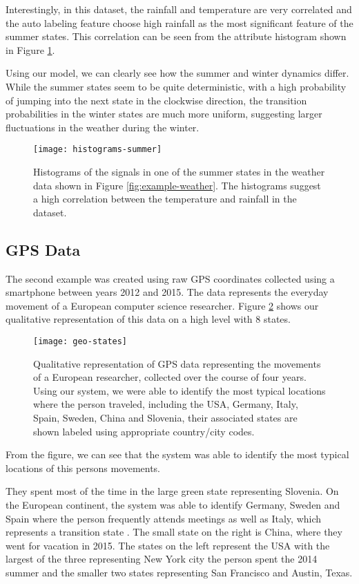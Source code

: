Interestingly, in this dataset, the rainfall and temperature are very correlated and the auto labeling feature
choose high rainfall as the most significant feature of the summer states. This correlation can be seen
from the attribute histogram shown in Figure \ref{fig:histograms-summer}.

Using our model, we can clearly see how the summer and winter dynamics differ. While the summer states seem to be quite deterministic, with a high probability of jumping into the next state in the clockwise direction, the transition probabilities in the winter states are much more uniform, suggesting larger fluctuations in the weather during the winter.

\begin{figure}[h!]
	\centering
	\texttt{[image: histograms-summer]}
	\caption{Histograms of the signals in one of the summer states in the weather data shown in Figure \ref{fig:example-weather}. The histograms suggest a high correlation between the temperature and rainfall in the dataset.}
	\label{fig:histograms-summer}
\end{figure}

\subsection{GPS Data}

The second example was created using raw GPS coordinates collected using a smartphone between years 2012 and 2015.
The data represents the everyday movement of a European computer science researcher. Figure \ref{fig:example-geo}
shows our qualitative representation of this data on a high level with 8 states.

\begin{figure}[h!]
	\centering
	\texttt{[image: geo-states]}
	\caption{Qualitative representation of GPS data representing the movements of a European researcher, collected over the course of four years. Using our system, we were able to identify the most typical locations where the person traveled, including the USA, Germany, Italy, Spain, Sweden, China and Slovenia, their associated states are shown labeled using appropriate country/city codes.}
	\label{fig:example-geo}
\end{figure}

From the figure, we can see that the system was able to identify the most typical locations of this persons
movements.

They spent most of the time in the large green state representing Slovenia. On the European continent, the system was able to identify Germany, Sweden and Spain where the person frequently attends meetings as well as Italy, which represents a transition state . The small state on the right is China, where they went for vacation in 2015. The states on the left represent the USA with the largest of the three representing New York city the person spent the 2014 summer and the smaller two states representing San Francisco and Austin, Texas.

